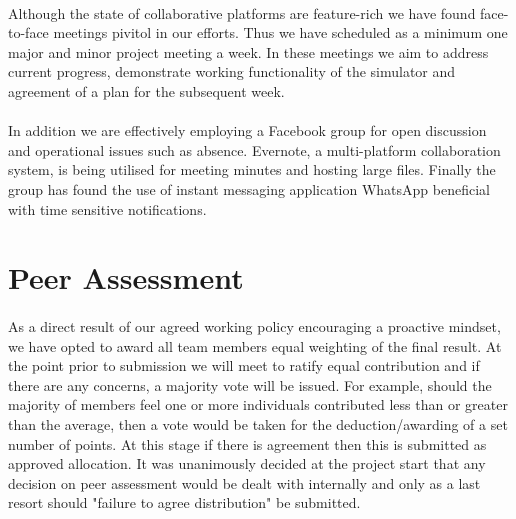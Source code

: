 \documentclass[11pt,a4paper]{article}
\begin{document}
\paragraph{}
Although the state of collaborative platforms are feature-rich we have found face-to-face meetings pivitol in our efforts.  Thus we have scheduled as a minimum one major and minor project meeting a week.  In these meetings we aim to address current progress, demonstrate working functionality of the simulator and agreement of a plan for the subsequent week.
\paragraph{}
In addition we are effectively employing a Facebook group for open discussion and operational issues such as absence.  Evernote, a multi-platform collaboration system, is being utilised for meeting minutes and hosting large files.  Finally the group has found the use of instant messaging application WhatsApp beneficial with time sensitive notifications.

\section{Peer Assessment}
\paragraph{}
As a direct result of our agreed working policy encouraging a proactive mindset, we have opted to award all team members equal weighting of the final result.  At the point prior to submission we will meet to ratify equal contribution and if there are any concerns, a majority vote will be issued.  For example, should the majority of members feel one or more individuals contributed less than or greater than the average, then a vote would be taken for the deduction/awarding of a set number of points.  At this stage if there is agreement then this is submitted as approved allocation.  It was unanimously decided at the project start that any decision on peer assessment would be dealt with internally and only as a last resort should "failure to agree distribution" be submitted.
\end{document}
